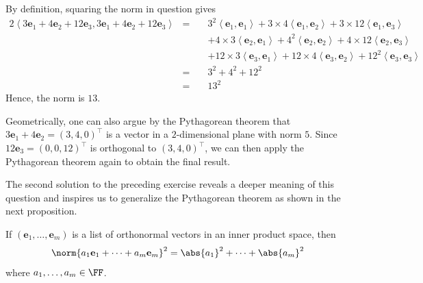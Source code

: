 \documentclass[thmcnt=section, color=blue, 12pt]{my-elegantbook}
\begin{document}
\begin{solution}
    By definition, squaring the norm in question gives
    \begin{alignat*}{2}
        \left\langle
            3 \mathbf{e}_1 + 4 \mathbf{e}_2 + 12 \mathbf{e}_3,
            3 \mathbf{e}_1 + 4 \mathbf{e}_2 + 12 \mathbf{e}_3
        \right\rangle
        &=& \; & 3^2 \left\langle \mathbf{e}_1, \mathbf{e}_1 \right\rangle
        + 3 \times 4 \left\langle \mathbf{e}_1, \mathbf{e}_2 \right\rangle
        + 3 \times 12 \left\langle \mathbf{e}_1, \mathbf{e}_3 \right\rangle \\ 
        &&& +4 \times 3 \left\langle \mathbf{e}_2, \mathbf{e}_1 \right\rangle
        + 4^2 \left\langle \mathbf{e}_2, \mathbf{e}_2 \right\rangle
        + 4 \times 12 \left\langle \mathbf{e}_2, \mathbf{e}_3 \right\rangle \\
        &&& +12 \times 3 \left\langle \mathbf{e}_3, \mathbf{e}_1 \right\rangle
        + 12 \times 4 \left\langle \mathbf{e}_3, \mathbf{e}_2 \right\rangle
        + 12^2 \left\langle \mathbf{e}_3, \mathbf{e}_3 \right\rangle \\
        &=&& 3^2 + 4^2 + 12^2 \\
        &=&& 13^2
    \end{alignat*}
    Hence, the norm is $13$.

    \par Geometrically, one can also argue by the Pythagorean theorem that $3 \mathbf{e}_1 + 4 \mathbf{e}_2 = (3, 4, 0)^\top$ is a vector in a $2$-dimensional plane with norm $5$. Since $12 \mathbf{e}_3 = (0, 0, 12)^\top$ is orthogonal to $(3, 4, 0)^\top$, we can then apply the Pythagorean theorem again to obtain the final result.
\end{solution}

\par The second solution to the preceding exercise reveals a deeper meaning of this question and inspires us to generalize the Pythagorean theorem as shown in the next proposition.

\begin{proposition} \label{pro:6}
    If $(\mathbf{e}_1, \ldots, \mathbf{e}_m)$ is a list of orthonormal vectors in an inner product space, then 
    \begin{align*}
        \norm{a_1 \mathbf{e}_1 + \cdots + a_m \mathbf{e}_m}^2
        = \abs{a_1}^2 + \cdots + \abs{a_m}^2
    \end{align*}
    where $a_1, \ldots, a_m \in \FF$.
\end{proposition}
\end{document}
